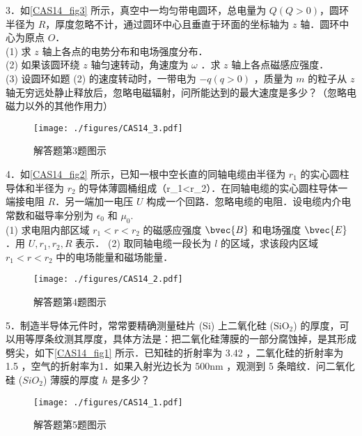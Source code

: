 3．如\autoref{CAS14_fig3} 所示，真空中一均匀带电圆环，总电量为 $Q(Q>0)$，圆环半径为 $R$，厚度忽略不计，通过圆环中心且垂直于环面的坐标轴为 $z$ 轴．圆环中心为原点 $O$．\\
(1) 求 $z$ 轴上各点的电势分布和电场强度分布．\\
(2) 如果该圆环绕 $z$ 轴匀速转动，角速度为 $\omega$ ．求 $z$ 轴上各点磁感应强度．\\
(3) 设圆环如题 (2) 的速度转动时，一带电为 $-q(q>0)$ ，质量为 $m$ 的粒子从 $z$ 轴无穷远处静止释放后，忽略电磁辐射，问所能达到的最大速度是多少？（忽略电磁力以外的其他作用力）
\begin{figure}[ht]
\centering
\texttt{[image: ./figures/CAS14\_3.pdf]}
\caption{解答题第3题图示} \label{CAS14_fig3}
\end{figure}

4．如\autoref{CAS14_fig2} 所示，已知一根中空长直的同轴电缆由半径为 $r_1$ 的实心圆柱导体和半径为 $r_2$ 的导体薄圆桶组成（r_1<r_2）．在同轴电缆的实心圆柱导体一端接电阻 $R$．另一端加一电压 $U$ 构成一个回路．忽略电缆的电阻．设电缆内介电常数和磁导率分别为 $\epsilon_0$ 和 $\mu_0$.\\
(1) 求电阻内部区域 $r_1<r<r_2$ 的磁感应强度 $\bvec{B}$ 和电场强度 $\bvec{E}$．用 $U,r_1,r_2,R$ 表示．
(2) 取同轴电缆一段长为 $l$ 的区域，求该段内区域 $r_1<r<r_2$ 中的电场能量和磁场能量．
\begin{figure}[ht]
\centering
\texttt{[image: ./figures/CAS14\_2.pdf]}
\caption{解答题第4题图示} \label{CAS14_fig2}
\end{figure}

5．制造半导体元件时，常常要精确测量硅片 (Si) 上二氧化硅 ($\mathrm{SiO_2}$) 的厚度，可以用等厚条纹测其厚度，具体方法是：把二氧化硅薄膜的一部分腐蚀掉，是其形成劈尖，如下\autoref{CAS14_fig1} 所示．已知硅的折射率为 3.42 ，二氧化硅的折射率为 1.5 ，空气的折射率为1．如果入射光边长为 $500\mathrm{nm}$ ，观测到 5 条暗纹．问二氧化硅 ($SiO_2$) 薄膜的厚度 $h$ 是多少？
\begin{figure}[ht]
\centering
\texttt{[image: ./figures/CAS14\_1.pdf]}
\caption{解答题第5题图示} \label{CAS14_fig1}
\end{figure}